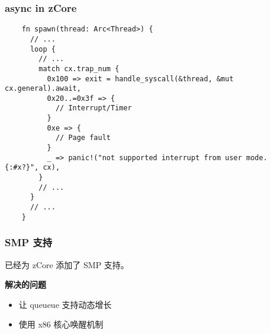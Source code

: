 \documentclass[UTF-8]{ctexbeamer}
\begin{document}
\begin{frame}[fragile]
  \frametitle{async in zCore}

  {
    \scriptsize
    \begin{verbatim}
    fn spawn(thread: Arc<Thread>) {
      // ...
      loop {
        // ...
        match cx.trap_num {
          0x100 => exit = handle_syscall(&thread, &mut cx.general).await,
          0x20..=0x3f => {
            // Interrupt/Timer
          }
          0xe => {
            // Page fault
          }
          _ => panic!("not supported interrupt from user mode. {:#x?}", cx),
        }
        // ...
      }
      // ...
    }
  \end{verbatim}
  }
\end{frame}

\begin{frame}
  \frametitle{SMP 支持}

  已经为 zCore 添加了 SMP 支持。

  \pause
  \vspace{1em}

  \textbf{解决的问题}

  \begin{itemize}
    \item 让 queueue 支持动态增长
    \item 使用 x86 核心唤醒机制
  \end{itemize}
\end{frame}
\end{document}
